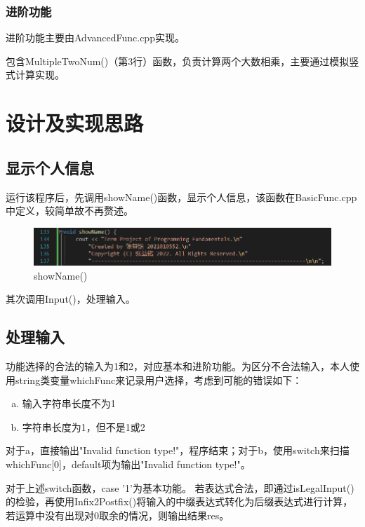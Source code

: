 \documentclass[a4paper, 11pt, UTF8]{ctexart}
\begin{document}
\subsubsection{进阶功能}

进阶功能主要由AdvancedFunc.cpp实现。

包含MultipleTwoNum()（第3行）函数，负责计算两个大数相乘，主要通过模拟竖式计算实现。

\section{设计及实现思路}

\subsection{显示个人信息}

运行该程序后，先调用showName()函数，显示个人信息，该函数在BasicFunc.cpp中定义，较简单故不再赘述。

\begin{figure}[H]
    \centering
    \includegraphics[width=\textwidth]{showname}
    \caption{showName()}
\end{figure}

其次调用Input()，处理输入。

\subsection{处理输入}

功能选择的合法的输入为1和2，对应基本和进阶功能。为区分不合法输入，本人使用string类变量whichFunc来记录用户选择，考虑到可能的错误如下：

\begin{enumerate}[a)]
    \item 输入字符串长度不为1
    \item 字符串长度为1，但不是1或2
\end{enumerate}

对于a，直接输出"Invalid function type!"，程序结束；对于b，使用switch来扫描whichFunc[0]，default项为输出"Invalid function type!"。

对于上述switch函数，case '1'为基本功能。
若表达式合法，即通过isLegalInput()的检验，再使用Infix2Postfix()将输入的中缀表达式转化为后缀表达式进行计算，
若运算中没有出现对0取余的情况，则输出结果res。
\end{document}
